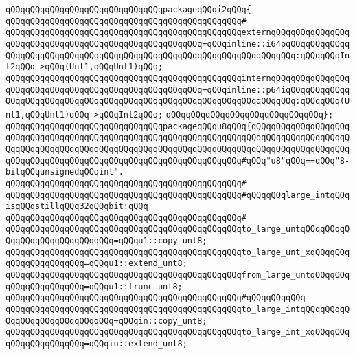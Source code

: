 \verb|qQQqqQQqqQQqqQQqqQQqqQQqqQQqqQQqpackageqQQqi2qQQq{|\newline
\verb|qQQqqQQqqQQqqQQqqQQqqQQqqQQqqQQqqQQqqQQqqQQqqQQq#|\newline
\verb|qQQqqQQqqQQqqQQqqQQqqQQqqQQqqQQqqQQqqQQqqQQqqQQqexternqQQqqQQqqQQqqQQqqQQqqQQqqQQqqQQqqQQqqQQqqQQqqQQqqQQqqQQq=qQQqinline::i64pqQQqqQQqqQQqqQQqqQQqqQQqqQQqqQQqqQQqqQQqqQQqqQQqqQQqqQQqqQQqqQQqqQQqqQQq:qQQqqQQqInt2qQQq->qQQq(Unt1,qQQqUnt1)qQQq;|\newline
\verb|qQQqqQQqqQQqqQQqqQQqqQQqqQQqqQQqqQQqqQQqqQQqqQQqinternqQQqqQQqqQQqqQQqqQQqqQQqqQQqqQQqqQQqqQQqqQQqqQQqqQQqqQQq=qQQqinline::p64iqQQqqQQqqQQqqQQqqQQqqQQqqQQqqQQqqQQqqQQqqQQqqQQqqQQqqQQqqQQqqQQqqQQqqQQq:qQQqqQQq(Unt1,qQQqUnt1)qQQq->qQQqInt2qQQq;|\newline
\verb|qQQqqQQqqQQqqQQqqQQqqQQqqQQqqQQq};|\newline
\newline
\verb|qQQqqQQqqQQqqQQqqQQqqQQqqQQqqQQqpackageqQQqu8qQQq{qQQqqQQqqQQqqQQqqQQqqQQqqQQqqQQqqQQqqQQqqQQqqQQqqQQqqQQqqQQqqQQqqQQqqQQqqQQqqQQqqQQqqQQqqQQqqQQqqQQqqQQqqQQqqQQqqQQqqQQqqQQqqQQqqQQqqQQqqQQqqQQqqQQqqQQqqQQqqQQqqQQqqQQqqQQqqQQqqQQqqQQqqQQqqQQqqQQqqQQqqQQqqQQq#qQQq"u8"qQQq==qQQq"8-bitqQQqunsignedqQQqint".|\newline
\verb|qQQqqQQqqQQqqQQqqQQqqQQqqQQqqQQqqQQqqQQqqQQqqQQq#|\newline
\newline
\verb|qQQqqQQqqQQqqQQqqQQqqQQqqQQqqQQqqQQqqQQqqQQqqQQq#qQQqqQQqlarge_intqQQqisqQQqstillqQQq32qQQqbit:qQQq|\newline
\verb|qQQqqQQqqQQqqQQqqQQqqQQqqQQqqQQqqQQqqQQqqQQqqQQq#|\newline
\verb|qQQqqQQqqQQqqQQqqQQqqQQqqQQqqQQqqQQqqQQqqQQqqQQqto_large_untqQQqqQQqqQQqqQQqqQQqqQQqqQQqqQQq=qQQqu1::copy_unt8;|\newline
\verb|qQQqqQQqqQQqqQQqqQQqqQQqqQQqqQQqqQQqqQQqqQQqqQQqto_large_unt_xqQQqqQQqqQQqqQQqqQQqqQQq=qQQqu1::extend_unt8;|\newline
\verb|qQQqqQQqqQQqqQQqqQQqqQQqqQQqqQQqqQQqqQQqqQQqqQQqfrom_large_untqQQqqQQqqQQqqQQqqQQqqQQq=qQQqu1::trunc_unt8;|\newline
\verb|qQQqqQQqqQQqqQQqqQQqqQQqqQQqqQQqqQQqqQQqqQQqqQQq#qQQqqQQqqQQq|\newline
\verb|qQQqqQQqqQQqqQQqqQQqqQQqqQQqqQQqqQQqqQQqqQQqqQQqto_large_intqQQqqQQqqQQqqQQqqQQqqQQqqQQqqQQq=qQQqin::copy_unt8;|\newline
\verb|qQQqqQQqqQQqqQQqqQQqqQQqqQQqqQQqqQQqqQQqqQQqqQQqto_large_int_xqQQqqQQqqQQqqQQqqQQqqQQq=qQQqin::extend_unt8;|\newline
